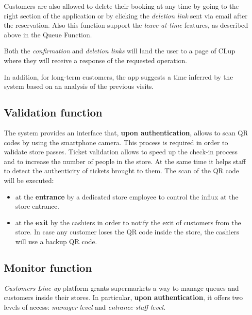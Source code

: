 	Customers are also allowed to delete their booking at any time by going to the right section of the application or by clicking the \textit{deletion link} sent via email after the reservation.
	Also this function support the \textit{leave-at-time} features, as described above in the Queue Function.
	
	Both the \textit{confirmation} and \textit{deletion links} will land the user to a page of CLup where they will receive a response of the requested operation.

	In addition, for long-term customers, the app suggests a time inferred by the system based on an analysis of the previous visits.

\subsection{Validation function}
The system provides an interface that, \textbf{upon authentication}, allows to scan QR codes by using the smartphone camera. This process is required in order to validate store passes.\newline
Ticket validation allows to speed up the check-in process and to increase the number of people in the store. At the same time it helps staff to detect the authenticity of tickets brought to them.\newline
The scan of the QR code will be executed:
\begin{itemize}
	\item at the \textbf{entrance} by a dedicated store employee to control the influx at the store entrance.
	\item at the \textbf{exit} by the cashiers in order to notify the exit of customers from the store. In case any customer loses the QR code inside the store, the cashiers will use a backup QR code.
\end{itemize}

\subsection{Monitor function}
\textit{Customers Line-up} platform grants supermarkets a way to manage queues and customers inside their stores. In particular, \textbf{upon authentication}, it offers two levels of access: \textit{manager level} and \textit{entrance-staff level}.

